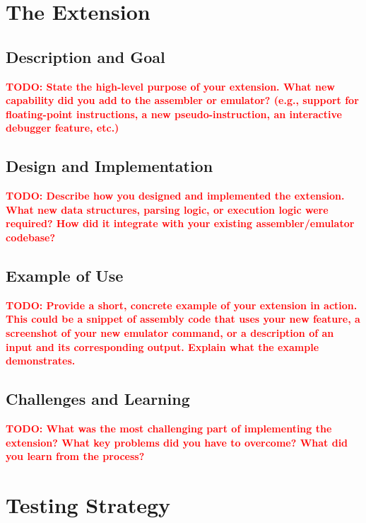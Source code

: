 \documentclass[11pt]{article}
\newcommand{\todo}[1]{\textcolor{red}{\textbf{TODO: #1}}}
\begin{document}
\section{The Extension}

\subsection{Description and Goal}
\todo{State the high-level purpose of your extension. What new capability did you add to the assembler or emulator? (e.g., support for floating-point instructions, a new pseudo-instruction, an interactive debugger feature, etc.)}

\subsection{Design and Implementation}
\todo{Describe how you designed and implemented the extension. What new data structures, parsing logic, or execution logic were required? How did it integrate with your existing assembler/emulator codebase?}

\subsection{Example of Use}
\todo{Provide a short, concrete example of your extension in action. This could be a snippet of assembly code that uses your new feature, a screenshot of your new emulator command, or a description of an input and its corresponding output. Explain what the example demonstrates.}

\subsection{Challenges and Learning}
\todo{What was the most challenging part of implementing the extension? What key problems did you have to overcome? What did you learn from the process?}


\section{Testing Strategy}
\end{document}
